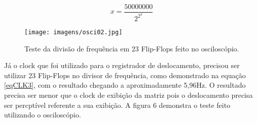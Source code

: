 \begin{equation} \label{eqCLK3}
    x=\frac{50000000}{2^2^3}
\end{equation}

\begin{figure}
    \centering
    \texttt{[image: imagens/osci02.jpg]}
    \caption{Teste da divisão de frequência em 23 Flip-Flops feito no osciloscópio.}
    \label{fig:osci23}
\end{figure}

Já o clock que foi utilizado para o registrador de deslocamento, precisou ser utilizar 23 Flip-Flops no divisor de frequência, como demonstrado na equação \ref{eqCLK3}, com o resultado chegando a aproximadamente 5,96Hz. O resultado precisa ser menor que o clock de exibição da matriz pois o deslocamento precisa ser percptível referente a sua exibição. A figura 6 demonstra o teste feito utilizando o osciloscópio.


